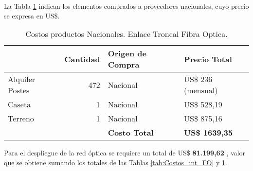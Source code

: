 La Tabla \ref{tab:Costos_nac_FO} indican los elementos comprados a proveedores nacionales, cuyo precio se expresa en US\$. 



\begin{table}[htbp]
  \centering
    \begin{tabular}{|r|r|l|l|}
    \hline
    \rowcolor[HTML]{C5D9F1} \multicolumn{1}{|l|}{\textbf{Descripción}} & \multicolumn{1}{l|}{\textbf{Cantidad}} & \textbf{Origen de Compra} & \textbf{Precio Total} \bigstrut\\
    \hline
    \multicolumn{1}{|l|}{Alquiler Postes} & 472   & Nacional & US\$ 236 (mensual) \bigstrut\\
    \hline
    \multicolumn{1}{|l|}{Caseta} & 1     & Nacional & US\$ 528,19 \bigstrut\\
    \hline
    \multicolumn{1}{|l|}{Terreno} & 1     & Nacional & US\$ 875,16 \bigstrut\\
    \hline
    \rowcolor[HTML]{C5D9F1}       &       & \textbf{Costo Total} & \textbf{US\$ 1639,35} \bigstrut\\
    \hline
    \end{tabular}%
\caption{Costos productos Nacionales. Enlace Troncal Fibra Optica.}
  \label{tab:Costos_nac_FO}%
\end{table}%



Para el despliegue de la red óptica se requiere un total de  US\$ \textbf{81.199,62} , valor que se obtiene sumando los totales de las Tablas \ref{tab:Costos_int_FO} y \ref{tab:Costos_nac_FO}.



\newpage






